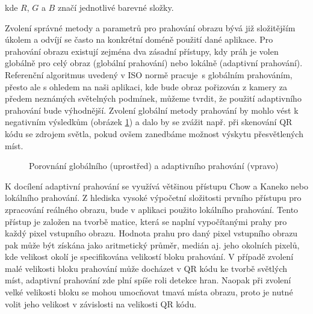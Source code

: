 \noindent kde $R$, $G$ a $B$ značí jednotlivé barevné složky.

Zvolení správné metody a parametrů pro prahování obrazu bývá již složitějším
úkolem a odvíjí se často na konkrétní doméně použití dané aplikace. Pro
prahování obrazu existují zejména dva zásadní přístupy, kdy práh je volen
globálně pro celý obraz (globální prahování) nebo lokálně (adaptivní 
prahování). Referenční algoritmus uvedený v ISO normě pracuje~s globálním
prahováním, přesto ale s ohledem na naši aplikaci, kde bude obraz pořizován z
kamery za předem neznámých světelných podmínek, můžeme tvrdit, že použití
adaptivního prahování bude výhodnější. Zvolení globální metody prahování by
mohlo vést k negativním výsledkům (obrázek
\ref{GlobalAdaptiveThresholdingComparision}) a dalo by se zvážit např. při skenování QR kódu se zdrojem světla, pokud ovšem zanedbáme možnost výskytu
přesvětlených míst.

\begin{figure}[H]
  \begin{center}
    \caption{Porovnání globálního (uprostřed) a adaptivního prahování (vpravo)}
    \label{GlobalAdaptiveThresholdingComparision}
  \end{center}
\end{figure}

K docílení adaptivní prahování se využívá většinou přístupu Chow a Kaneko nebo
lokálního prahování. Z hlediska vysoké výpočetní složitosti prvního přístupu
pro zpracování reálného obrazu, bude v aplikaci použito lokálního prahování.
Tento přístup je založen na tvorbě matice, která se naplní vypočítanými prahy
pro každý pixel vstupního obrazu. Hodnota prahu pro daný pixel vstupního obrazu
pak může být získána jako aritmetický průměr, medián aj. jeho okolních pixelů,
kde velikost okolí je specifikována velikostí bloku prahování. V případě zvolení
malé velikosti bloku prahování může docházet v QR kódu ke tvorbě světlých míst,
adaptivní prahování zde plní spíše roli detekce hran. Naopak při zvolení velké
velikosti bloku se mohou umocňovat tmavá místa obrazu, proto je nutné volit
jeho velikost v závislosti na velikosti QR kódu. \cite{adaptiveThresholdLit}

